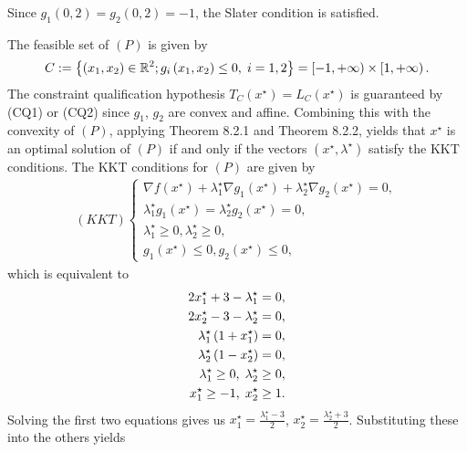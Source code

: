 \documentclass[a4paper]{article}
\numberwithin{equation}{section}
\begin{document}
\begin{enumerate}
Since ${g_1}\left( {0,2} \right) = {g_2}\left( {0,2} \right) =  - 1$, the Slater condition is satisfied.

The feasible set of $\left(P\right)$ is given by
\begin{align}
C: = \left\{ {\left( {{x_1},{x_2}} \right) \in {\mathbb{R}^2};{g_i}\left( {{x_1},{x_2}} \right) \le 0, \hspace{0.1cm} i = 1,2} \right\} = \left[ { - 1, + \infty } \right) \times \left[ {1, + \infty } \right).
\end{align}
The constraint qualification hypothesis $T_C\left(x^\star\right) =L_C\left(x^\star\right)$ is guaranteed by (CQ1) or (CQ2) since $g_1$, $g_2$ are convex and affine. Combining this with the convexity of $\left(P\right)$, applying Theorem 8.2.1 and Theorem 8.2.2, \cite{2} yields that $x^\star$ is an optimal solution of $\left(P\right)$ if and only if the vectors $\left(x^\star,\lambda ^\star\right)$ satisfy the KKT conditions. The KKT conditions for $\left(P\right)$ are given by 
\begin{align}
\label{1.118}
\left( {KKT} \right)\left\{ {\begin{array}{*{20}{l}}
{\nabla f\left( {{x^\star}} \right) + \lambda _1^\star\nabla {g_1}\left( {{x^\star}} \right) + \lambda _2^\star\nabla {g_2}\left( {{x^\star}} \right) = 0,}\\
{\lambda _1^\star{g_1}\left( {{x^\star}} \right) = \lambda _2^\star{g_2}\left( {{x^\star}} \right) = 0,}\\
{\lambda _1^\star \ge 0,\lambda _2^\star \ge 0,}\\
{{g_1}\left( {{x^\star}} \right) \le 0,{g_2}\left( {{x^\star}} \right) \le 0,}
\end{array}} \right.
\end{align}
which is equivalent to
\begin{align}
2x_1^\star + 3 - \lambda _1^\star &= 0,\\
2x_2^\star - 3 - \lambda _2^\star &= 0,\\
\lambda _1^\star\left( {1 + x_1^\star} \right) &= 0,\\
\lambda _2^\star\left( {1 - x_2^\star} \right) &= 0,\\
\lambda _1^\star \ge 0, \hspace{0.1cm}  \lambda _2^\star &\ge 0,\\
x_1^\star \ge  - 1, \hspace{0.1cm} x_2^\star &\ge 1.
\end{align}
Solving the first two equations gives us $x_1^\star = \frac{{\lambda _1^\star - 3}}{2}$, $x_2^\star = \frac{{\lambda _2^\star + 3}}{2}$. Substituting these into the others yields

\end{enumerate}
\end{document}
